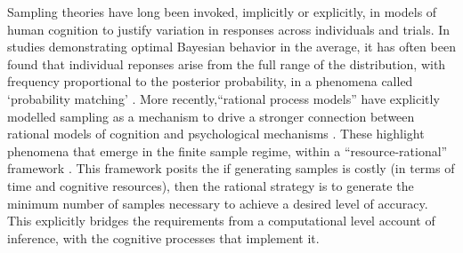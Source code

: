 Sampling theories have long been invoked, implicitly or explicitly, in models of human cognition to justify variation in responses across individuals and trials. In studies demonstrating optimal Bayesian behavior in the average, it has often been found that individual reponses arise from the full range of the distribution, with frequency proportional to the posterior probability, in a phenomena called `probability matching' \citep{wozny2010,Denison2013,Moreno11,Vul2014}. More recently,``rational process models'' have explicitly modelled sampling as a mechanism to drive a stronger connection between rational models of cognition and psychological mechanisms \cite{griffiths2012bridging, Vul2014, shi10, sanborn2010rational, Lieder2013}. These highlight phenomena that emerge in the finite sample regime, within a ``resource-rational'' framework \citep{Vul2014,griffiths2015,Gershman2015,schulz2016simple}. This framework posits the if generating samples is costly (in terms of time and cognitive resources), then the rational strategy is to generate the minimum number of samples necessary to achieve a desired level of accuracy. This explicitly bridges the requirements from a computational level account of inference, with the cognitive processes that implement it. 

